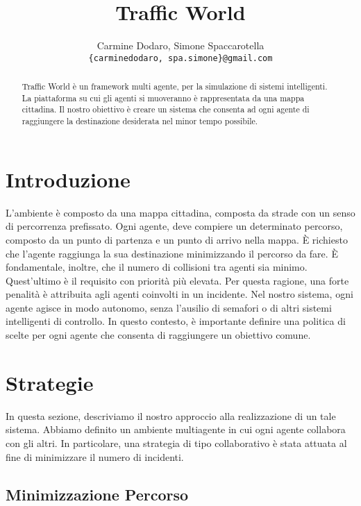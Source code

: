 \documentclass[a4paper,10pt]{article}
\title{Traffic World}
\author{
    Carmine Dodaro, Simone Spaccarotella \\
    \texttt{\{carminedodaro, spa.simone\}@gmail.com}
}
\begin{document}
    \maketitle

    \begin{abstract}
	Traffic World è un framework multi agente, per la simulazione di sistemi
	intelligenti. La piattaforma su cui gli agenti si muoveranno è
	rappresentata da una mappa cittadina. Il nostro obiettivo è creare un sistema
	che consenta ad ogni agente di raggiungere la destinazione desiderata nel minor
	tempo possibile.
    \end{abstract}

    \section{Introduzione}
	L'ambiente è composto da una mappa cittadina, composta da strade con un senso
	di percorrenza prefissato. Ogni agente, deve compiere un determinato percorso,
	composto da un punto di partenza e un punto di arrivo nella mappa. È richiesto
	che l'agente raggiunga la sua destinazione minimizzando il percorso da fare. È
	fondamentale, inoltre, che il numero di collisioni tra agenti sia minimo.
	Quest'ultimo è il requisito con priorità più elevata. Per questa ragione, una
	forte penalità è attribuita agli agenti coinvolti in un incidente. Nel nostro
	sistema, ogni agente agisce in modo autonomo, senza l'ausilio di semafori o di
	altri sistemi intelligenti di controllo. In questo contesto, è importante
	definire una politica di scelte per ogni agente che consenta di raggiungere un
	obiettivo comune.
	
	\section{Strategie}
    In questa sezione, descriviamo il nostro approccio alla realizzazione di un
    tale sistema. Abbiamo definito un ambiente multiagente in cui ogni agente
    collabora con gli altri. In particolare, una strategia di tipo collaborativo
    è stata attuata al fine di minimizzare il numero di incidenti.
    
    \subsection{Minimizzazione Percorso}
    
\end{document}

